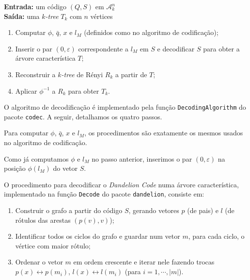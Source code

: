 \begin{algorithm}
  \textbf{Entrada:} um código $(Q, S)$ em $\mathcal{A}^n_k$\\
  \textbf{Saída:} uma \emph{$k$-tree} $T_k$ com $n$ vértices

  \begin{enumerate}
    \item Computar $\phi$, $\bar{q}$, $x$ e $l_M$ (definidos como no algoritmo de codificação);
    \item Inserir o par $(0, \varepsilon)$ correspondente a $l_M$ em $S$ e decodificar $S$ para obter a árvore característica $T$;
    \item Reconstruir a \emph{$k$-tree} de Rényi $R_k$ a partir de $T$;
    \item Aplicar $\phi^{-1}$ a $R_k$ para obter $T_k$.
  \end{enumerate}

  O algoritmo de decodificação é implementado pela função {\tt DecodingAlgorithm} do pacote {\tt codec}. A seguir, detalhamos os quatro passos.

  \setcounter{step}{0}

  \begin{step}
    Para computar $\phi$, $\bar{q}$, $x$ e $l_M$, os procedimentos são exatamente os mesmos usados no algoritmo de codificação.
  \end{step}

  \begin{step}
    Como já computamos $\phi$ e $l_M$ no passo anterior, inserimos o par $(0, \varepsilon)$ na posição $\phi(l_M)$ do vetor $S$.

    O procedimento para decodificar o \emph{Dandelion Code} numa árvore característica, implementado na função {\tt Decode} do pacote {\tt dandelion}, consiste em:

    \begin{enumerate}
      \item Construir o grafo a partir do código $S$, gerando vetores $p$ (de pais) e $l$ (de rótulos das arestas $(p(v), v)$);
      \item Identificar todos os ciclos do grafo e guardar num vetor $m$, para cada ciclo, o vértice com maior rótulo;
      \item Ordenar o vetor $m$ em ordem crescente e iterar nele fazendo trocas $p(x) \leftrightarrow p(m_i)$, $l(x) \leftrightarrow l(m_i)$ (para $i = 1, \cdots, |m|$).
    \end{enumerate}


\end{step}
\end{algorithm}
